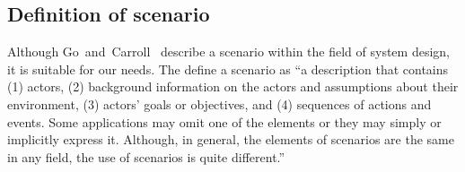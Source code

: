 \subsection{Definition of scenario}
\label{sec:scenario definition}



Although Go~and~Carroll~\cite{go2004blind} describe a scenario within the field of system design, it is suitable for our needs. The define a scenario as ``a description that contains (1) actors, (2) background information on the actors and assumptions about their environment, (3) actors' goals or objectives, and (4) sequences of actions and events. Some applications may omit one of the elements or they may simply or implicitly express it. Although, in general, the elements of scenarios are the same in any field, the use of scenarios is quite different.'' 

